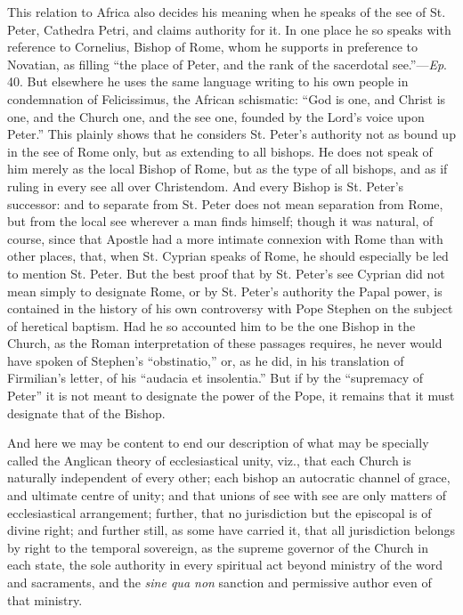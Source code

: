 This relation to Africa also decides his meaning
when he speaks of the see of St. Peter, Cathedra Petri, and
claims authority for it. In one place he so speaks with reference to
Cornelius, Bishop of Rome, whom he supports in preference to Novatian,
as filling ``the place of Peter, and the rank of the sacerdotal see.''—\emph{Ep}.
40. But elsewhere he uses the same language writing to his own people
in condemnation of Felicissimus, the African schismatic: ``God is one,
and Christ is one, and the Church one, and the see one, founded by the
Lord's voice upon Peter.'' This plainly shows that he considers St.
Peter's authority not as bound up in the see of Rome only, but as
extending to all bishops. He does not speak of him merely as the local
Bishop of Rome, but as the type of all bishops, and as if ruling in
every see all over Christendom. And every Bishop is St. Peter's
successor: and to separate from St. Peter does not mean separation
from Rome, but from the local see wherever a man finds himself; though
it was natural, of course, since that Apostle had a more intimate
connexion with Rome than with other places, that, when St. Cyprian
speaks of Rome, he should especially be led to mention St. Peter. But
the best proof that by St. Peter's see Cyprian did not mean simply to
designate Rome, or by St. Peter's authority the Papal power, is
contained in the history of his own controversy with Pope Stephen on
the subject of heretical baptism. Had he so accounted him to be the
one Bishop in the Church, as the Roman interpretation of these
passages requires, he never would have spoken of Stephen's ``obstinatio,''
or, as he did, in his translation of Firmilian's letter, of his ``audacia
et insolentia.'' But if by the ``supremacy of Peter'' it is not meant to
designate the power of the Pope, it remains that it must designate
that of the Bishop.

And here we may be content to end our description
of what may be specially called the Anglican theory of ecclesiastical unity, viz., that each Church is naturally independent
of every other; each bishop an autocratic channel of grace, and
ultimate centre of unity; and that unions of see with see are only
matters of ecclesiastical arrangement; further, that no jurisdiction
but the episcopal is of divine right; and further still, as some have
carried it, that all jurisdiction belongs by right to the temporal sovereign,
as the supreme governor of the Church in each state, the sole
authority in every spiritual act beyond ministry of the word and
sacraments, and the \emph{sine qua non} sanction and permissive author
even of that ministry.

